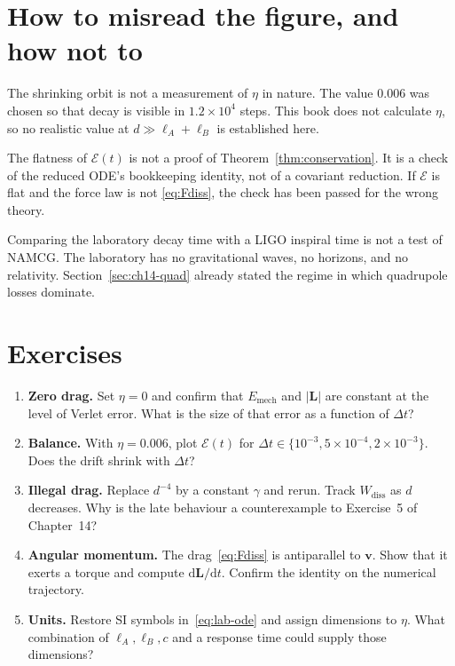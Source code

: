\section{How to misread the figure, and how not to}
\label{sec:ch15-misread}

The shrinking orbit is not a measurement of \(\eta\) in nature.
The value \(0.006\) was chosen so that decay is visible in
\(1.2\times 10^{4}\) steps. This book does not calculate
\(\eta\), so no realistic value at \(d\gg\ell_A+\ell_B\) is
established here.

The flatness of \(\mathcal{E}(t)\) is not a proof of
Theorem~\ref{thm:conservation}. It is a check of the reduced
ODE's bookkeeping identity, not of a covariant reduction. If
\(\mathcal{E}\) is flat and the force law is not
\eqref{eq:Fdiss}, the check has been passed for the wrong theory.

Comparing the laboratory decay time with a LIGO inspiral time is
not a test of NAMCG. The laboratory has no gravitational waves,
no horizons, and no relativity. Section~\ref{sec:ch14-quad}
already stated the regime in which quadrupole losses dominate.

\section{Exercises}
\label{sec:ch15-exercises}

\begin{enumerate}
  \item \textbf{Zero drag.}
    Set \(\eta=0\) and confirm that \(E_{\mathrm{mech}}\) and
    \(|\mathbf{L}|\) are constant at the level of Verlet error.
    What is the size of that error as a function of \(\Delta t\)?
  \item \textbf{Balance.}
    With \(\eta=0.006\), plot \(\mathcal{E}(t)\) for
    \(\Delta t\in\{10^{-3},5\times 10^{-4},2\times 10^{-3}\}\).
    Does the drift shrink with \(\Delta t\)?
  \item \textbf{Illegal drag.}
    Replace \(d^{-4}\) by a constant \(\gamma\) and rerun. Track
    \(W_{\mathrm{diss}}\) as \(d\) decreases. Why is the late
    behaviour a counterexample to Exercise~5 of Chapter~14?
  \item \textbf{Angular momentum.}
    The drag~\eqref{eq:Fdiss} is antiparallel to \(\mathbf{v}\).
    Show that it exerts a torque and compute
    \(\mathrm{d}\mathbf{L}/\mathrm{d}t\). Confirm the identity
    on the numerical trajectory.
  \item \textbf{Units.}
    Restore SI symbols in~\eqref{eq:lab-ode} and assign dimensions
    to \(\eta\). What combination of \(\ell_A,\ell_B,c\) and a
    response time could supply those dimensions?
\end{enumerate}


